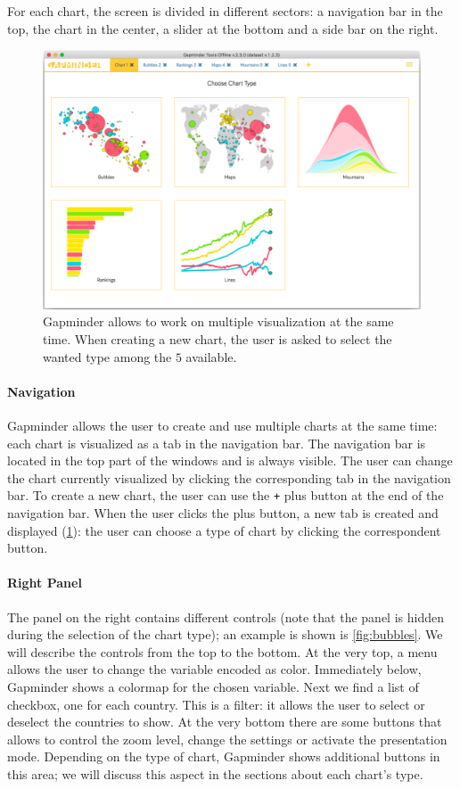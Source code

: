 For each chart, the screen is divided in different sectors:
a navigation bar in the top, the chart in the center, a slider at the bottom and a side bar on the right.

\begin{figure}[h]
	\centering
	\includegraphics[width=0.95\columnwidth]{figures/home}
	\caption{Gapminder allows to work on multiple visualization at the same time. When creating a new chart, the user is asked to select the wanted type among the $5$ available.}
	\label{fig:home}
\end{figure}

\paragraph{Navigation}
Gapminder allows the user to create and use multiple charts at the same time: each chart is visualized as a tab in the navigation bar.
The navigation bar is located in the top part of the windows and is always visible.
The user can change the chart currently visualized by clicking the corresponding tab in the navigation bar.
To create a new chart, the user can use the \texttt{+} plus button at the end of the navigation bar.
When the user clicks the plus button, a new tab is created and displayed (\cref{fig:home}):
the user can choose a type of chart by clicking the correspondent button.

\paragraph{Right Panel}
The panel on the right contains different controls (note that the panel is hidden during the selection of the chart type);
an example is shown is \cref{fig:bubbles}.
We will describe the controls from the top to the bottom.
At the very top, a menu allows the user to change the variable encoded as color.
Immediately below, Gapminder shows a colormap for the chosen variable.
Next we find a list of checkbox, one for each country.
This is a filter: it allows the user to select or deselect the countries to show.
At the very bottom there are some buttons that allows to control the zoom level, change the settings or activate the presentation mode.
Depending on the type of chart, Gapminder shows additional buttons in this area;
we will discuss this aspect in the sections about each chart's type.

